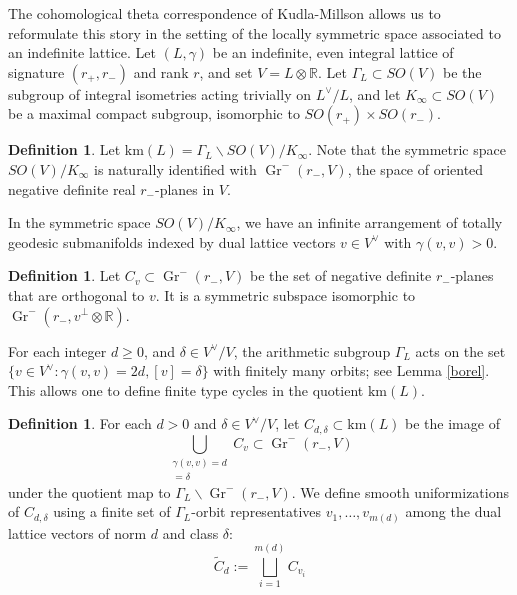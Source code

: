 \documentclass[12pt]{amsart}
\def\bR{\mathbb{R}}
\DeclareMathOperator{\Gr}{Gr}
\newcommand{\bs}{\backslash}
\newcommand{\km}{\mathrm{km}}
\theoremstyle{definition}
\newtheorem{defn}[thm]{Definition}
\begin{document}
The cohomological theta correspondence of Kudla-Millson allows us to reformulate this story in the setting of the locally symmetric space associated to an indefinite lattice. Let $(L,\gamma)$ be an indefinite, even integral lattice of signature $(r_+,r_-)$ and rank $r$, and set $V = L\otimes \bR$. Let $\Gamma_L\subset SO(V)$ be the subgroup of integral isometries acting trivially on $L^\vee/L$, and let $K_\infty\subset SO(V)$ be a maximal compact subgroup, isomorphic to $SO(r_+)\times SO(r_-)$.
\begin{defn}
    Let $\km(L)= \Gamma_L \bs SO(V)/K_\infty$. Note that the symmetric space $SO(V)/K_\infty$ is naturally identified with $\Gr^-(r_-,V)$, the space of oriented negative definite real $r_-$-planes in $V$.
\end{defn}
In the symmetric space $SO(V)/K_\infty$, we have an infinite arrangement of totally geodesic submanifolds indexed by dual lattice vectors $v\in V^\vee$ with $\gamma(v,v)>0$.
\begin{defn}
    Let $C_v\subset \Gr^-(r_-,V)$ be the set of negative definite $r_-$-planes that are orthogonal to $v$. It is a symmetric subspace isomorphic to $\Gr^-(r_-,v^\perp\otimes\bR)$.
\end{defn}
For each integer $d\geq 0$, and $\delta\in V^\vee/V$, the arithmetic subgroup $\Gamma_L$ acts on the set $\{v\in V^\vee: \gamma(v,v)=2d, [v] = \delta\}$ with finitely many orbits; see Lemma \ref{borel}. This allows one to define finite type cycles in the quotient $\km(L)$.
\begin{defn}
    For each $d>0$ and $\delta\in V^\vee/V$, let $C_{d,\delta}\subset \km(L)$ be the image of 
    $$\bigcup_{\substack{\gamma(v,v)=d \\ [v] = \delta}} C_v \subset \Gr^-(r_-,V)$$
    under the quotient map to $\Gamma_L \bs \Gr^-(r_-,V)$. We define smooth uniformizations of $C_{d,\delta}$ using a finite set of $\Gamma_L$-orbit representatives $v_1,\dots,v_{m(d)}$ among the dual lattice vectors of norm $d$ and class $\delta$:
    $$\widetilde{C}_d := \bigsqcup_{i=1}^{m(d)} C_{v_i}$$
\end{defn}
\end{document}
